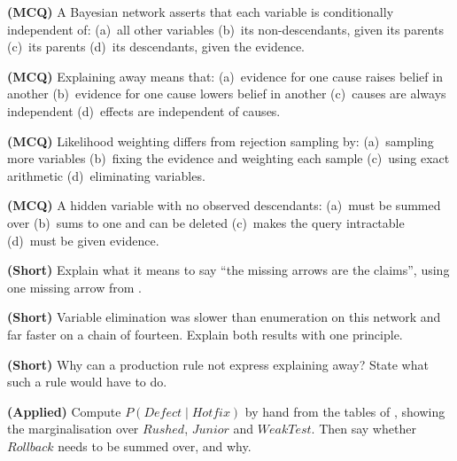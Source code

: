 \begin{reviewq}
  \item \textbf{(MCQ)} A Bayesian network asserts that each variable is conditionally
        independent of: (a)~all other variables (b)~its non-descendants, given its
        parents (c)~its parents (d)~its descendants, given the evidence.
  \item \textbf{(MCQ)} Explaining away means that: (a)~evidence for one cause raises
        belief in another (b)~evidence for one cause lowers belief in another
        (c)~causes are always independent (d)~effects are independent of causes.
  \item \textbf{(MCQ)} Likelihood weighting differs from rejection sampling by:
        (a)~sampling more variables (b)~fixing the evidence and weighting each
        sample (c)~using exact arithmetic (d)~eliminating variables.
  \item \textbf{(MCQ)} A hidden variable with no observed descendants:
        (a)~must be summed over (b)~sums to one and can be deleted
        (c)~makes the query intractable (d)~must be given evidence.
  \item \textbf{(Short)} Explain what it means to say ``the missing arrows are the
        claims'', using one missing arrow from .
  \item \textbf{(Short)} Variable elimination was slower than enumeration on this
        network and far faster on a chain of fourteen. Explain both results with
        one principle.
  \item \textbf{(Short)} Why can a production rule not express explaining away?
        State what such a rule would have to do.
  \item \textbf{(Applied)} Compute $P(\mathit{Defect} \mid \mathit{Hotfix})$ by hand
        from the tables of , showing the marginalisation over
        $\mathit{Rushed}$, $\mathit{Junior}$ and $\mathit{WeakTest}$. Then say
        whether $\mathit{Rollback}$ needs to be summed over, and why.
\end{reviewq}
